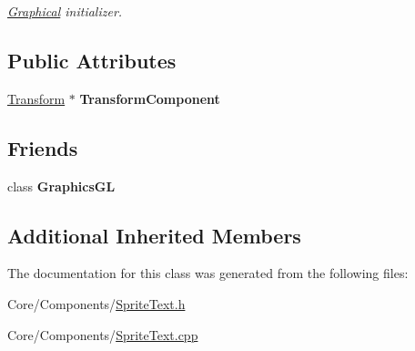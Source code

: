 \begin{DoxyCompactItemize}
\begin{DoxyCompactList}\small\item\em \hyperlink{classDCEngine_1_1Components_1_1Graphical}{Graphical} initializer. \end{DoxyCompactList}\end{DoxyCompactItemize}
\subsection*{Public Attributes}
\begin{DoxyCompactItemize}
\item 
\hypertarget{classDCEngine_1_1Components_1_1SpriteText_a5b9d23c96be9109713d9b692257227f3}{\hyperlink{classDCEngine_1_1Components_1_1Transform}{Transform} $\ast$ {\bfseries Transform\-Component}}\label{classDCEngine_1_1Components_1_1SpriteText_a5b9d23c96be9109713d9b692257227f3}

\end{DoxyCompactItemize}
\subsection*{Friends}
\begin{DoxyCompactItemize}
\item 
\hypertarget{classDCEngine_1_1Components_1_1SpriteText_ae9935fef993313b67d691534d6fe5b4f}{class {\bfseries Graphics\-G\-L}}\label{classDCEngine_1_1Components_1_1SpriteText_ae9935fef993313b67d691534d6fe5b4f}

\end{DoxyCompactItemize}
\subsection*{Additional Inherited Members}


The documentation for this class was generated from the following files\-:\begin{DoxyCompactItemize}
\item 
Core/\-Components/\hyperlink{SpriteText_8h}{Sprite\-Text.\-h}\item 
Core/\-Components/\hyperlink{SpriteText_8cpp}{Sprite\-Text.\-cpp}\end{DoxyCompactItemize}

